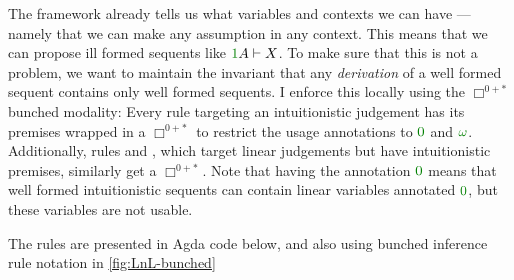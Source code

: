 The framework already tells us what variables and contexts we can
have --- namely that we can make any assumption in any context.
This means that we can propose ill formed sequents like
$\gr1A \vdash X$.
To make sure that this is not a problem, we want to maintain the invariant that
any \emph{derivation} of a well formed sequent contains only well formed
sequents.
I enforce this locally using the $\Box^{0{+}{*}}$ bunched modality:
Every rule targeting an intuitionistic judgement has its premises wrapped in a
$\Box^{0{+}{*}}$ to restrict the usage annotations to $\gr0$ and $\gr\omega$.
Additionally, rules  and , which target linear
judgements but have intuitionistic premises, similarly get a $\Box^{0{+}{*}}$.
Note that having the annotation $\gr0$ means that well formed intuitionistic
sequents can contain linear variables annotated $\gr0$, but these variables are
not usable.

The rules are presented in Agda code below, and also using bunched inference
rule notation in \cref{fig:LnL-bunched}


